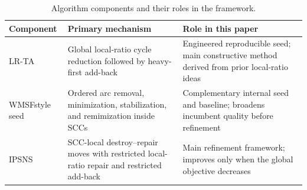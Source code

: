 \begin{table}[t]
\centering
\caption{Algorithm components and their roles in the framework.}
\label{tab:algorithm-components}
\begin{tabular}{>{\raggedright\arraybackslash}p{2.2cm} >{\raggedright\arraybackslash}p{3.8cm} >{\raggedright\arraybackslash}p{5.8cm}}
\toprule
Component & Primary mechanism & Role in this paper \\
\midrule
LR-TA & Global local-ratio cycle reduction followed by heavy-first add-back & Engineered reproducible seed; main constructive method derived from prior local-ratio ideas \\
WMSF\-style seed & Ordered arc removal, minimization, stabilization, and remimization inside SCCs & Complementary internal seed and baseline; broadens incumbent quality before refinement \\
IPSNS & SCC-local destroy--repair moves with restricted local-ratio repair and restricted add-back & Main refinement framework; improves only when the global objective decreases \\
\bottomrule
\end{tabular}
\end{table}
